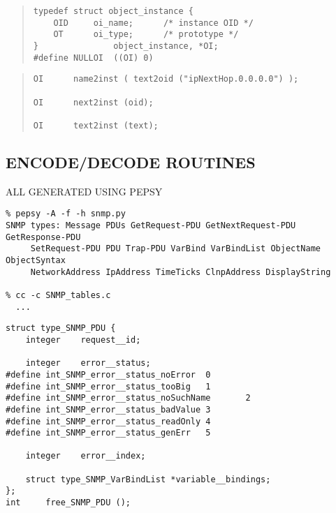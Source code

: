 \begin{bwslide}

\begin{quote}\small\begin{verbatim}
typedef struct object_instance {
    OID     oi_name;      /* instance OID */
    OT      oi_type;      /* prototype */
}               object_instance, *OI;
#define NULLOI  ((OI) 0)
\end{verbatim}\end{quote}
\end{bwslide}


\begin{bwslide}

\begin{quote}\small\begin{verbatim}
OI      name2inst ( text2oid ("ipNextHop.0.0.0.0") );

OI      next2inst (oid);

OI      text2inst (text);
\end{verbatim}\end{quote}
\end{bwslide}


\begin{bwslide}
\part*	{ENCODE/DECODE ROUTINES}\bf

\begin{nrtc}
\item	ALL GENERATED USING PEPSY
\end{nrtc}
\end{bwslide}


\begin{bwslide}\small
\begin{verbatim}
% pepsy -A -f -h snmp.py
SNMP types: Message PDUs GetRequest-PDU GetNextRequest-PDU GetResponse-PDU
     SetRequest-PDU PDU Trap-PDU VarBind VarBindList ObjectName ObjectSyntax
     NetworkAddress IpAddress TimeTicks ClnpAddress DisplayString

% cc -c SNMP_tables.c
  ...
\end{verbatim}
\end{bwslide}


\begin{bwslide}\small
\begin{verbatim}
struct type_SNMP_PDU {
    integer    request__id;

    integer    error__status;
#define int_SNMP_error__status_noError  0
#define int_SNMP_error__status_tooBig   1
#define int_SNMP_error__status_noSuchName       2
#define int_SNMP_error__status_badValue 3
#define int_SNMP_error__status_readOnly 4
#define int_SNMP_error__status_genErr   5

    integer    error__index;

    struct type_SNMP_VarBindList *variable__bindings;
};
int     free_SNMP_PDU ();
\end{verbatim}
\end{bwslide}


